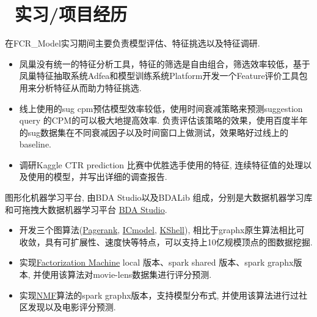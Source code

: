 \documentclass[10pt]{resume}
\begin{document}
\section{\faUsers\ 实习/项目经历}
\begin{onehalfspacing}
在FCR\_Model实习期间主要负责模型评估、特征挑选以及特征调研.
\begin{itemize}
  \item 凤巢没有统一的特征分析工具，特征的筛选是自由组合，筛选效率较低，基于凤巢特征抽取系统Adfea和模型训练系统Platform开发一个Feature评价工具包用来分析特征从而助力特征挑选.
  \item 线上使用的sug cpm预估模型效率较低，使用时间衰减策略来预测suggestion query 的CPM的可以极大地提高效率. 负责评估该策略的效果，使用百度半年的sug数据集在不同衰减因子以及时间窗口上做测试，效果略好过线上的baseline.
  \item 调研Kaggle CTR prediction 比赛中优胜选手使用的特征, 连续特征值的处理以及使用的模型，并写出详细的调查报告.
\end{itemize}
\end{onehalfspacing}

\begin{onehalfspacing}
图形化机器学习平台, 由BDA Studio以及BDALib 组成，分别是大数据机器学习库和可拖拽大数据机器学习平台 \href{http://bda.space:18080}{BDA Studio}.
\begin{itemize}
  \item 开发三个图算法(\href{http://bda.space:18080/BDAStudioMonitor.html?job=0000001-160229111630187-oozie-oozi-W}{Pagerank}, \href{http://bda.space:18080/BDAStudioMonitor.html?job=0000015-160229111630187-oozie-oozi-W}{ICmodel}, \href{http://bda.space:18080/BDAStudioMonitor.html?job=0000206-151222123224608-oozie-oozi-W}{KShell}), 相比于graphx原生算法相比可收敛，具有可扩展性、速度快等特点，可以支持上10亿规模顶点的图数据挖掘.
  \item 实现\href{http://bda.space:18080/BDAStudioMonitor.html?job=0000009-160229111630187-oozie-oozi-W}{Factorization Machine} local 版本、spark shared 版本、spark graphx版本, 并使用该算法对movie-lens数据集进行评分预测.
  \item 实现\href{http://bda.space:18080/BDAStudioMonitor.html?job=0000021-160229111630187-oozie-oozi-W}{NMF}算法的spark graphx版本，支持模型分布式, 并使用该算法进行过社区发现以及电影评分预测.
\end{itemize}
\end{onehalfspacing}
\end{document}

